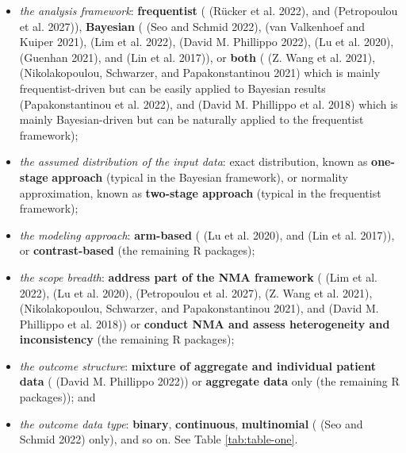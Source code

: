 \begin{itemize}
\tightlist
\item
  \emph{the analysis framework}: \textbf{frequentist} ( (Rücker et al. 2022), and
   (Petropoulou et al. 2027)), \textbf{Bayesian} ( (Seo and Schmid 2022),
   (van Valkenhoef and Kuiper 2021),  (Lim et al. 2022),  (David M. Phillippo 2022),
   (Lu et al. 2020),  (Guenhan 2021), and 
  (Lin et al. 2017)), or \textbf{both} ( (Z. Wang et al. 2021), 
  (Nikolakopoulou, Schwarzer, and Papakonstantinou 2021) which is mainly frequentist-driven but can be easily applied to Bayesian
  results (Papakonstantinou et al. 2022), and  (David M. Phillippo et al. 2018) which is
  mainly Bayesian-driven but can be naturally applied to the frequentist framework);
\item
  \emph{the assumed distribution of the input data}: exact distribution, known as \textbf{one-stage}
  \textbf{approach} (typical in the Bayesian framework), or normality approximation, known as
  \textbf{two-stage approach} (typical in the frequentist framework);
\item
  \emph{the modeling approach}: \textbf{arm-based} ( (Lu et al. 2020), and
   (Lin et al. 2017)), or \textbf{contrast-based} (the remaining R packages);
\item
  \emph{the scope breadth}: \textbf{address part of the NMA framework} ( (Lim et al. 2022),
   (Lu et al. 2020),  (Petropoulou et al. 2027),
   (Z. Wang et al. 2021),  (Nikolakopoulou, Schwarzer, and Papakonstantinou 2021), and 
  (David M. Phillippo et al. 2018)) or \textbf{conduct NMA and assess heterogeneity and inconsistency}
  (the remaining R packages);
\item
  \emph{the outcome structure}: \textbf{mixture of aggregate and individual patient data}
  ( (David M. Phillippo 2022)) or \textbf{aggregate data} only (the remaining R
  packages)); and
\item
  \emph{the outcome data type}: \textbf{binary}, \textbf{continuous}, \textbf{multinomial} ( (Seo and Schmid 2022) only),
  and so on.
  See Table \ref{tab:table-one}.
\end{itemize}

